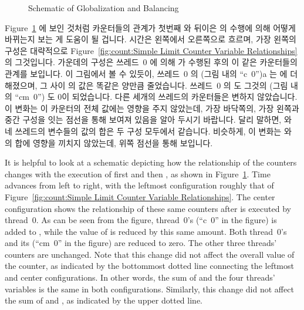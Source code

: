 \begin{figure}[tb]
\centering
{}
\caption{Schematic of Globalization and Balancing}
\label{fig:count:Schematic of Globalization and Balancing}
\end{figure}

Figure~\ref{fig:count:Schematic of Globalization and Balancing}
에 보인 것처럼 카운터들의 관계가 첫번째  와 뒤이은
 의 수행에 의해 어떻게 바뀌는지 보는 게 도움이 될 겁니다.
시간은 왼쪽에서 오른쪽으로 흐르며, 가장 왼쪽의 구성은 대략적으로
Figure~\ref{fig:count:Simple Limit Counter Variable Relationships}
의 그것입니다.
가운데의 구성은 쓰레드~0 에 의해  가 수행된 후의 이 같은
카운터들의 관계를 보입니다.
이 그림에서 볼 수 있듯이, 쓰레드~0 의  (그림 내의 ``c~0'')a 는
 에 더해졌으며, 그 사이  의 값은 똑같은
양만큼 줄었습니다.
쓰레드~0 의  도 그것의  (그림 내의 ``cm~0'') 도 0이
되었습니다.
다른 세개의 쓰레드의 카운터들은 변하지 않았습니다.
이 변화는 이 카운터의 전체 값에는 영향을 주지 않았는데, 가장 바닥쪽의, 가장
왼쪽과 중간 구성을 잇는 점선을 통해 보여져 있음을 알아 두시기 바랍니다.
달리 말하면,  와 네 쓰레드의  변수들의 값의 합은 두
구성 모두에서 같습니다.
비슷하게, 이 변화는  와  의 합에 영향을
끼치지 않았는데, 위쪽 점선을 통해 보입니다.

\iffalse

It is helpful to look at a schematic depicting how the relationship
of the counters changes with the execution of first
 and then , as shown in
Figure~\ref{fig:count:Schematic of Globalization and Balancing}.
Time advances from left to right, with the leftmost configuration
roughly that of
Figure~\ref{fig:count:Simple Limit Counter Variable Relationships}.
The center configuration shows the relationship of these same counters
after  is executed by thread~0.
As can be seen from the figure, thread~0's  (``c~0'' in
the figure) is added to , while the value of
 is reduced by this same amount.
Both thread~0's  and its 
(``cm~0'' in the figure) are reduced to zero.
The other three threads' counters are unchanged.
Note that this change did not affect the overall value of the counter,
as indicated by the bottommost dotted line connecting the leftmost
and center configurations.
In other words, the sum of  and the four threads'
 variables is the same in both configurations.
Similarly, this change did not affect the sum of  and
, as indicated by the upper dotted line.

